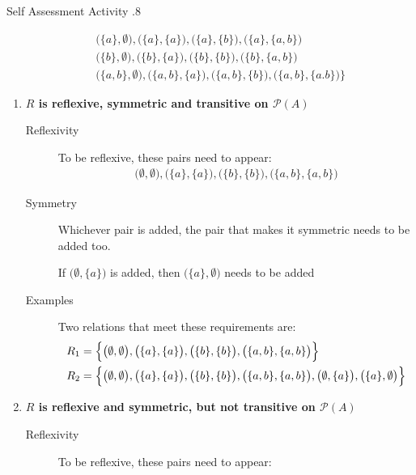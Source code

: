 \documentclass[../notes.tex]{subfiles}
\begin{document}
\begin{exercise}{Self Assessment Activity \thechapter.8}
\begin{enumerate}
\begin{align*}
									& \quad \bigl(\{a\}, \emptyset\bigr), \bigl(\{a\}, \{a\}\bigr), \bigl(\{a\}, \{b\}\bigr), \bigl(\{a\}, \{a, b\}\bigr)\\
									& \quad \bigl(\{b\}, \emptyset\bigr), \bigl(\{b\}, \{a\}\bigr), \bigl(\{b\}, \{b\}\bigr), \bigl(\{b\}, \{a, b\}\bigr)\\
									& \quad \bigl(\{a, b\}, \emptyset\bigr), \bigl(\{a, b\}, \{a\}\bigr), \bigl(\{a, b\}, \{b\}\bigr), \bigl(\{a, b\}, \{a. b\}\bigr)
								\Bigr\}
							\end{align*}
							\begin{enumerate}[label=(\alph*)]
								\item \textbf{$R$ is reflexive, symmetric and transitive on $\mathcal{P}(A)$}
									\begin{description}
										\item[Reflexivity] To be reflexive, these pairs need to appear:
											\begin{align*}
												\bigl(\emptyset, \emptyset\bigr), \bigl(\{a\}, \{a\}\bigr), \bigl(\{b\}, \{b\}\bigr), \bigl(\{a, b\}, \{a, b\}\bigr)
											\end{align*}
										\item[Symmetry] Whichever pair is added, the pair that makes it symmetric needs to be added too.
											\begin{adjustwidth}{1cm}{}
												If $\bigl(\emptyset, \{a\}\bigr)$ is added, then $\bigl(\{a\}, \emptyset\bigr)$ needs to be added
											\end{adjustwidth}
										\item[Examples] Two relations that meet these requirements are:
											\begin{align*}
												R_{1} &= \Bigl\{\bigl(\emptyset, \emptyset\bigr), \bigl(\{a\}, \{a\}\bigr), \bigl(\{b\}, \{b\}\bigr), \bigl(\{a, b\}, \{a, b\}\bigr)\Bigr\}\\
												R_{2} &= \Bigl\{\bigl(\emptyset, \emptyset\bigr), \bigl(\{a\}, \{a\}\bigr), \bigl(\{b\}, \{b\}\bigr), \bigl(\{a, b\}, \{a, b\}\bigr), \bigl(\emptyset, \{a\}\bigr), \bigl(\{a\}, \emptyset\bigr)\Bigr\}
											\end{align*}
									\end{description}
								\item \textbf{$R$ is reflexive and symmetric, but not transitive on $\mathcal{P}(A)$}
									\begin{description}
										\item[Reflexivity] To be reflexive, these pairs need to appear:

\end{description}
\end{enumerate}
\end{enumerate}
\end{exercise}
\end{document}
